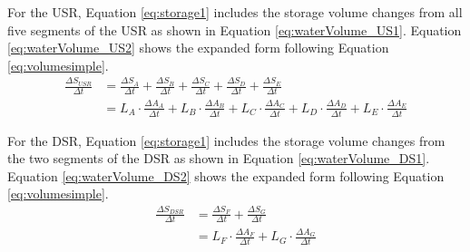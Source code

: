\begin{linenumbers}
For the USR, Equation \ref{eq:storage1} includes the storage volume changes from all five segments of the USR as shown in Equation \ref{eq:waterVolume_US1}.  Equation \ref{eq:waterVolume_US2} shows the expanded form following Equation \ref{eq:volumesimple}.
\begin{align}
	\frac{\Delta S_{USR}}{\Delta t} & = \frac{\Delta S_{A}}{\Delta t} + \frac{\Delta S_{B}}{\Delta t} + \frac{\Delta S_{C}}{\Delta t} + \frac{\Delta S_{D}}{\Delta t} + \frac{\Delta S_{E}}{\Delta t} \label{eq:waterVolume_US1} \\
	& = L_A \cdot \frac{\Delta A_{A}}{\Delta t} + L_B \cdot \frac{\Delta A_{B}}{\Delta t} + L_C \cdot \frac{\Delta A_{C}}{\Delta t} + L_D \cdot \frac{\Delta A_{D}}{\Delta t} + L_E \cdot \frac{\Delta A_{E}}{\Delta t} \label{eq:waterVolume_US2}
\end{align}

For the DSR, Equation \ref{eq:storage1} includes the storage volume changes from the two segments of the DSR as shown in Equation \ref{eq:waterVolume_DS1}.  Equation \ref{eq:waterVolume_DS2} shows the expanded form following Equation \ref{eq:volumesimple}.
\begin{align}
	\frac{\Delta S_{DSR}}{\Delta t} & = \frac{\Delta S_{F}}{\Delta t} + \frac{\Delta S_{G}}{\Delta t} \label{eq:waterVolume_DS1} \\
	& = L_F \cdot \frac{\Delta A_{F}}{\Delta t} + L_G \cdot \frac{\Delta A_{G}}{\Delta t} \label{eq:waterVolume_DS2}
\end{align}


\end{linenumbers}
